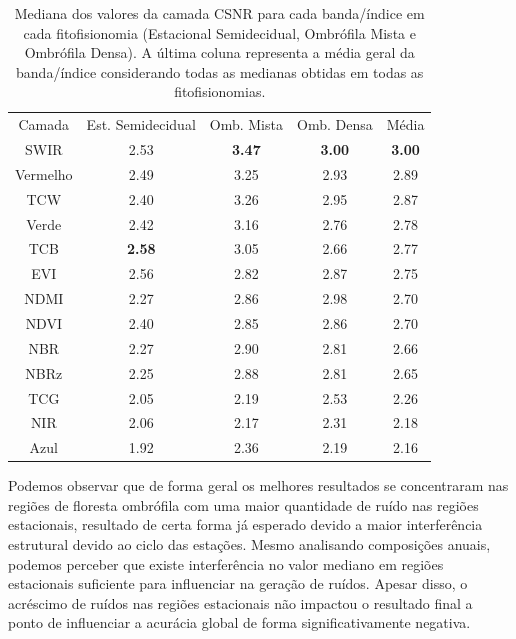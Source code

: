 \begin{table}[h!]
    \centering
    \begin{tabular}{| c | c | c| c | c |}
    \hline
            Camada & Est. Semidecidual & Omb. Mista & Omb. Densa & Média \\
            SWIR & 2.53 & \textbf{3.47} & \textbf{3.00} & \textbf{3.00} \\
            Vermelho & 2.49 & 3.25 & 2.93 & 2.89 \\
            TCW & 2.40 & 3.26 & 2.95 & 2.87 \\
            Verde & 2.42 & 3.16 & 2.76 & 2.78 \\
            TCB & \textbf{2.58} & 3.05 & 2.66 & 2.77 \\
            EVI & 2.56 & 2.82 & 2.87 & 2.75 \\
            NDMI & 2.27 & 2.86 & 2.98 & 2.70 \\
            NDVI & 2.40 & 2.85 & 2.86 & 2.70 \\
            NBR & 2.27 & 2.90 & 2.81 & 2.66 \\
            NBRz & 2.25 & 2.88 & 2.81 & 2.65 \\
            TCG & 2.05 & 2.19 & 2.53 & 2.26 \\
            NIR & 2.06 & 2.17 & 2.31 & 2.18 \\
            Azul & 1.92 & 2.36 & 2.19 & 2.16 \\
    \hline
    \end{tabular}
    \caption{Mediana dos valores da camada CSNR para cada banda/índice em cada fitofisionomia (Estacional Semidecidual, Ombrófila Mista e Ombrófila Densa). A última coluna representa a média geral da banda/índice considerando todas as medianas obtidas em todas as fitofisionomias.}
    \label{tab:csnr_results}
\end{table}

Podemos observar que de forma geral os melhores resultados se concentraram nas regiões de floresta ombrófila com uma maior quantidade de ruído nas regiões estacionais, resultado de certa forma já esperado devido a maior interferência estrutural devido ao ciclo das estações. Mesmo analisando composições anuais, podemos perceber que existe interferência no valor mediano em regiões estacionais suficiente para influenciar na geração de ruídos. Apesar disso, o acréscimo de ruídos nas regiões estacionais não impactou o resultado final a ponto de influenciar a acurácia global de forma significativamente negativa.

